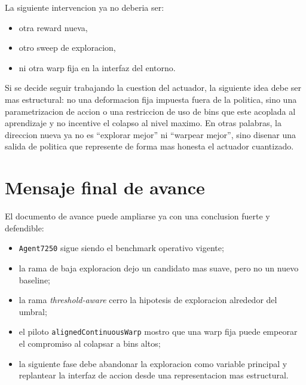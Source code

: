 \documentclass[11pt,a4paper]{article}
\begin{document}
La siguiente intervencion ya no deberia ser:

\begin{itemize}
\item otra reward nueva,
\item otro sweep de exploracion,
\item ni otra warp fija en la interfaz del entorno.
\end{itemize}

Si se decide seguir trabajando la cuestion del actuador, la siguiente idea debe ser mas estructural: no una deformacion fija impuesta fuera de la politica, sino una parametrizacion de accion o una restriccion de uso de bins que este acoplada al aprendizaje y no incentive el colapso al nivel maximo. En otras palabras, la direccion nueva ya no es ``explorar mejor'' ni ``warpear mejor'', sino disenar una salida de politica que represente de forma mas honesta el actuador cuantizado.

\section{Mensaje final de avance}

El documento de avance puede ampliarse ya con una conclusion fuerte y defendible:

\begin{itemize}
\item \texttt{Agent7250} sigue siendo el benchmark operativo vigente;
\item la rama de baja exploracion dejo un candidato mas suave, pero no un nuevo baseline;
\item la rama \textit{threshold-aware} cerro la hipotesis de exploracion alrededor del umbral;
\item el piloto \texttt{alignedContinuousWarp} mostro que una warp fija puede empeorar el compromiso al colapsar a bins altos;
\item la siguiente fase debe abandonar la exploracion como variable principal y replantear la interfaz de accion desde una representacion mas estructural.
\end{itemize}
\end{document}
